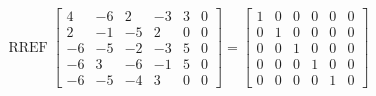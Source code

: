 \begin{exerciseAnswer} 


\[\operatorname{RREF} \left[\begin{array}{ccccc|c}
4 & -6 & 2 & -3 & 3 & 0 \\
2 & -1 & -5 & 2 & 0 & 0 \\
-6 & -5 & -2 & -3 & 5 & 0 \\
-6 & 3 & -6 & -1 & 5 & 0 \\
-6 & -5 & -4 & 3 & 0 & 0
\end{array}\right] = \left[\begin{array}{ccccc|c}
1 & 0 & 0 & 0 & 0 & 0 \\
0 & 1 & 0 & 0 & 0 & 0 \\
0 & 0 & 1 & 0 & 0 & 0 \\
0 & 0 & 0 & 1 & 0 & 0 \\
0 & 0 & 0 & 0 & 1 & 0
\end{array}\right] \]



\end{exerciseAnswer}

